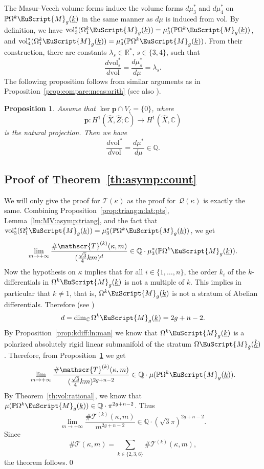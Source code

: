 \documentclass[JEP,XML,SOM,Unicode]{cedram}
\let\mathcal\EuScript
\theoremstyle{plain}
\newtheorem{Proposition}[Theorem]{Proposition}
\theoremstyle{definition}
\newcommand{\R}{\mathbb{R}}
\def\C{\mathbb{C}}
\newcommand{\Q}{\mathbb{Q}}
\newcommand{\Pb}{\mathbb{P}}
\newcommand{\pp}{\boldsymbol{p}}
\newcommand{\Mcal}{\mathcal{M}}
\newcommand{\QQ}{\mathscr{Q}}
\newcommand{\TT}{\mathscr{T}}
\newcommand{\vol}{\mathrm{vol}}
\newcommand{\hX}{\hat{X}}
\newcommand{\hZ}{\hat{Z}}
\let\ul\underline
\newcommand{\Skdiff}{\Omega^k\mathcal{M}_{g}(\ul{k})}
\newcommand{\Skdiffi}{\Omega^k_1\mathcal{M}_{g}(\ul{k})}
\newcommand{\Sabel}{\Omega\Mcal_{\hat{g}}(\ul{\hat{k}})}
\newcommand{\pSkdiff}{\Pb\Omega^k\mathcal{M}_{g}(\ul{k})}
\begin{document}
The Masur-Veech volume forms induce the volume forms $d\mu_3^*$ and $d\mu_4^*$ on $\pSkdiff$ in the same manner as $d\mu$ is induced from $\vol$.
By definition, we have $\vol_3^*(\Skdiffi)=\mu^*_3(\pSkdiff)$, and $\vol_4^*(\Skdiffi)=\mu^*_4(\pSkdiff)$.
From their construction, there are constants $\lambda_s \in \R^*, \, s\in \{3,4\}$, such that
\[
\frac{d\vol_s^*}{d\vol}=\frac{d\mu_s^*}{d\mu}=\lambda_s.
\]
The following proposition follows from similar arguments as in Proposition~\ref{prop:compare:meas:arith} (see also \cite[]{Ngu19}).
\begin{Proposition}\label{prop:ratio:vol:forms}
Assume that $\ker\pp\cap V_\zeta=\{0\}$, where
\[
\pp: H^1(\hX,\hZ;\C) \to H^1(\hX,\C)
\]
is the natural projection. Then we have
\[
\frac{d\vol^*}{d\vol}=\frac{d\mu^*}{d\mu} \in \Q.
\]
\end{Proposition}

\subsection{Proof of Theorem~\ref{th:asymp:count}}
We will only give the proof for $\TT(\kappa)$ as the proof for~$\QQ(\kappa)$ is exactly the same.
Combining Proposition~\ref{prop:triang:n:lat:pts}, Lemma~\ref{lm:MV:asymp:triang}, and the fact that $\vol^*_3(\Skdiffi)=\mu^*_3(\pSkdiff)$, we get
\[
\lim_{m\to +\infty}\frac{\#\TT^{(k)}(\kappa,m)}{(\frac{\sqrt{3}}{4}km)^d} \in \Q\cdot\mu_3^*(\pSkdiff).
\]
Now the hypothesis on $\kappa$ implies that for all $i\in \{1,\dots,n\}$, the order $k_i$ of the $k$\nobreakdash-dif\-ferentials in $\Skdiff$ is not a multiple of $k$. This implies in particular that $k\neq 1$, that is, $\Skdiff$ is not a stratum of Abelian differentials. Therefore (see \cite{BCGGM:kdiff, Ngu19})
\[
d=\dim_\C\Skdiff=2g+n-2.
\]
By Proposition~\ref{prop:kdiff:ln:man} we know that $\Skdiff$ is a polarized absolutely rigid linear submanifold of the stratum $\Sabel$.
Therefore, from Proposition~\ref{prop:ratio:vol:forms} we get
\[
\lim_{m\to +\infty}\frac{\#\TT^{(k)}(\kappa,m)}{(\frac{\sqrt{3}}{4}km)^{2g+n-2}} \in \Q\cdot\mu(\pSkdiff).
\]
By Theorem~\ref{th:vol:rational}, we know that $\mu(\pSkdiff) \in \Q\cdot\pi^{2g+n-2}$. Thus
\[
\lim_{m\to +\infty}\frac{\#\TT^{(k)}(\kappa,m)}{m^{2g+n-2}} \in \Q\cdot(\sqrt{3}\pi)^{2g+n-2}.
\]
Since
\[
\#\TT(\kappa,m)=\sum_{k\in\{2,3,6\}} \#\TT^{(k)}(\kappa,m),
\]
the theorem follows.\qed

\backmatter


\end{document}
